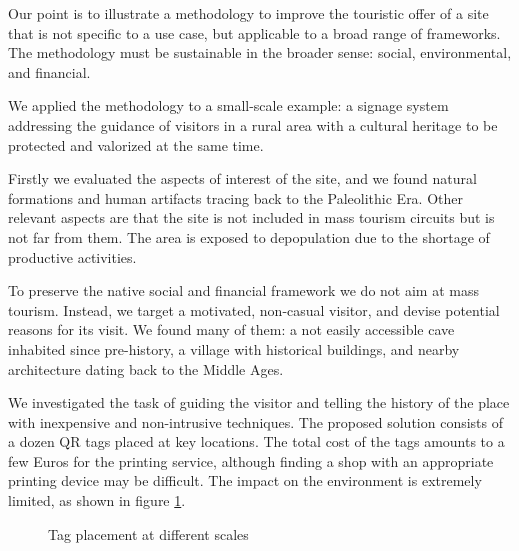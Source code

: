 \documentclass[sustainability,article,submit,pdftex,moreauthors]{Definitions/mdpi}
\begin{document}
Our point is to illustrate a methodology to improve the touristic offer of a site that is not specific to a use case, but applicable to a broad range of frameworks. The methodology must be sustainable in the broader sense: social, environmental, and financial.

We applied the methodology to a small-scale example: a signage system addressing the guidance of visitors in a rural area with a cultural heritage to be protected and valorized at the same time.

Firstly we evaluated the aspects of interest of the site, and we found natural formations and human artifacts tracing back to the Paleolithic Era. Other relevant aspects are that the site is not included in mass tourism circuits but is not far from them. The area is exposed to depopulation due to the shortage of productive activities.

To preserve the native social and financial framework we do not aim at mass tourism. Instead, we target a motivated, non-casual visitor, and devise potential reasons for its visit. We found many of them: a not easily accessible cave inhabited since pre-history, a village with historical buildings, and nearby architecture dating back to the Middle Ages.

We investigated the task of guiding the visitor and telling the history of the place with inexpensive and non-intrusive techniques. The proposed solution consists of a dozen QR tags placed at key locations. The total cost of the tags amounts to a few Euros for the printing service, although finding a shop with an appropriate printing device may be difficult. The impact on the environment is extremely limited, as shown in figure \ref{fig:TagPlacement}.

\begin{figure}
\hfill
{}
\caption{Tag placement at different scales}
\label{fig:TagPlacement}
\end{figure}
\end{document}
